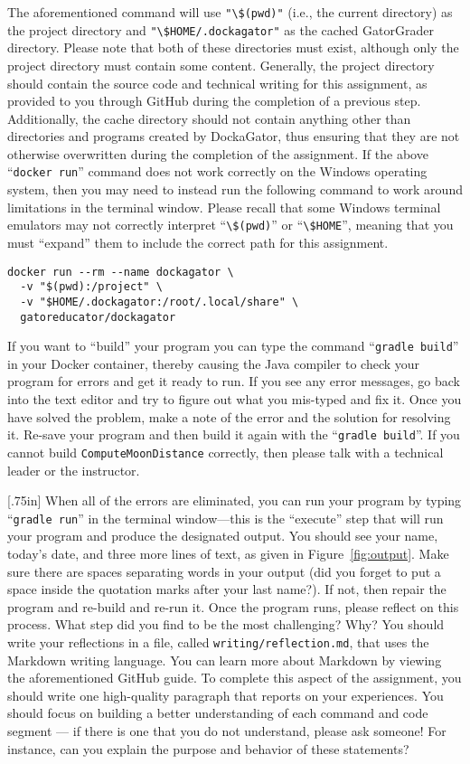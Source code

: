 \documentclass[11pt]{article}
\newcommand{\mainprogram}{\lstinline{ComputeMoonDistance}}
\newcommand{\reflection}{\lstinline{writing/reflection.md}}
\newcommand{\gradlebuild}{\command{gradle build}}
\newcommand{\gradlerun}{\command{gradle run}}
\newcommand{\command}[1]{``\lstinline{#1}''}
\newcommand{\program}[1]{\lstinline{#1}}
\newcommand{\step}[1]{``{#1}''}
\newcommand{\think}[1]{\null\hfill\LARGE{\faCogs{}}\newline\scriptsize{\em{#1}}}
\begin{document}
The aforementioned command will use \program{"\$(pwd)"} (i.e., the current
directory) as the project directory and \program{"\$HOME/.dockagator"} as the
cached GatorGrader directory. Please note that both of these directories must
exist, although only the project directory must contain some content. Generally,
the project directory should contain the source code and technical writing for
this assignment, as provided to you through GitHub during the completion of a
previous step. Additionally, the cache directory should not contain anything
other than directories and programs created by DockaGator, thus ensuring that
they are not otherwise overwritten during the completion of the assignment. If
the above \command{docker run} command does not work correctly on the Windows
operating system, then you may need to instead run the following command to work
around limitations in the terminal window. Please recall that some Windows
terminal emulators may not correctly interpret \command{\$(pwd)} or
\command{\$HOME}, meaning that you must ``expand'' them to include the correct
path for this assignment.

\begin{verbatim}
docker run --rm --name dockagator \
  -v "$(pwd):/project" \
  -v "$HOME/.dockagator:/root/.local/share" \
  gatoreducator/dockagator
\end{verbatim}


If you want to \step{build} your program you can type the command \gradlebuild{}
in your Docker container, thereby causing the Java compiler to check your
program for errors and get it ready to run. If you see any error messages, go
back into the text editor and try to figure out what you mis-typed and fix it.
Once you have solved the problem, make a note of the error and the solution for
resolving it. Re-save your program and then build it again with the
\gradlebuild{}. If you cannot build \mainprogram{} correctly, then please talk
with a technical leader or the instructor.

\marginnote{\think{Reflect on challenges}}[.75in] When all of the errors are
eliminated, you can run your program by typing \gradlerun{} in the terminal
window---this is the ``execute'' step that will run your program and produce the
designated output. You should see your name, today's date, and three more lines
of text, as given in Figure~\ref{fig:output}. Make sure there are spaces
separating words in your output (did you forget to put a space inside the
quotation marks after your last name?). If not, then repair the program and
re-build and re-run it. Once the program runs, please reflect on this process.
What step did you find to be the most challenging? Why? You should write your
reflections in a file, called \reflection{}, that uses the Markdown writing
language. You can learn more about Markdown by viewing the aforementioned GitHub
guide. To complete this aspect of the assignment, you should write one
high-quality paragraph that reports on your experiences. You should focus on
building a better understanding of each command and code segment --- if there is
one that you do not understand, please ask someone! For instance, can you
explain the purpose and behavior of these statements?
\end{document}
